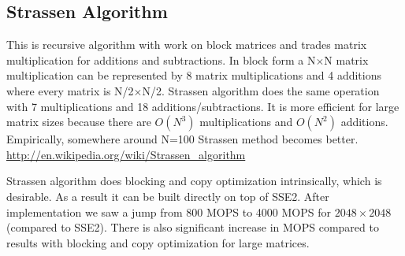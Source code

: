 \documentclass{article}
\begin{document}
\subsection{Strassen Algorithm}
This is recursive algorithm with work on block matrices and trades matrix multiplication for additions and subtractions.  
In block form a N$\times$N matrix multiplication can be represented by 8 matrix multiplications and 4 additions where every matrix is N/2$\times$N/2. Strassen algorithm does the same operation with 7 multiplications and 18 additions/subtractions.  It is more efficient for large matrix sizes because there are $O(N^3)$ multiplications and $O(N^2)$ additions.  Empirically,  somewhere around N=100 Strassen method becomes better. \url{http://en.wikipedia.org/wiki/Strassen_algorithm}

Strassen algorithm does blocking and copy optimization intrinsically, which is desirable.  As a result it can be built directly on top of SSE2.
After implementation we saw a jump from 800 MOPS to 4000 MOPS for $2048\times2048$ (compared to SSE2).  There is also significant increase in MOPS compared to results with blocking and copy optimization for large matrices.
\end{document}
